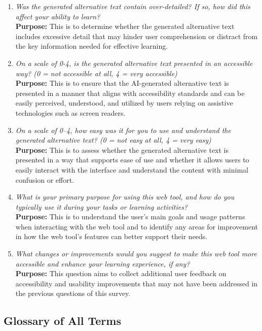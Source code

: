\documentclass[12pt, titlepage]{article}
\begin{document}
\begin{enumerate}[label=UA-Q \arabic*., wide=0pt, leftmargin=*]
  \item \emph{Was the generated alternative text contain over-detailed? If so, how did this affect 
  your ability to learn?}\\[2mm]
    {\bf Purpose:} This is to determine whether the generated alternative text includes excessive detail that may hinder user 
    comprehension or distract from the key information needed for effective learning.

  \item \emph{On a scale of 0-4, is the generated alternative text presented in an accessible way? (0 = not accessible at all, 4 = very accessible)}\\[2mm]
    {\bf Purpose:} This is to ensure that the AI-generated alternative text is presented in a manner that aligns with accessibility standards and 
    can be easily perceived, understood, and utilized by users relying on assistive technologies such as screen readers.

  \item \emph{On a scale of 0–4, how easy was it for you to use and understand the generated alternative text? (0 = not easy at all, 4 = very easy)}\\[2mm]
    {\bf Purpose:} This is to assess whether the generated alternative text is presented in a way that supports ease of use and whether it allows users to easily interact with 
    the interface and understand the content with minimal confusion or effort.
  
  \item \emph{What is your primary purpose for using this web tool, and how do you typically use it during your tasks or learning activities?}\\[2mm]
  {\bf Purpose:} This is to understand the user’s main goals and usage patterns when interacting with the web tool and to identify any areas for improvement in how the web tool's features 
  can better support their needs.

  \item \emph{What changes or improvements would you suggest to make this web tool more accessible and enhance your learning experience, if any?}\\[2mm]
  {\bf Purpose:} This question aims to collect additional user feedback on accessibility and usability improvements that may not have been addressed in the previous questions of this survey.
\end{enumerate}

\subsection{Glossary of All Terms}
\end{document}
